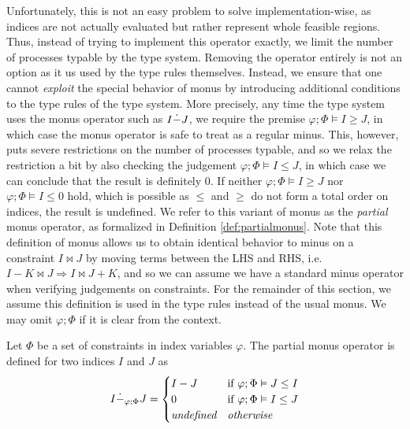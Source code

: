 Unfortunately, this is not an easy problem to solve implementation-wise, as indices are not actually evaluated but rather represent whole feasible regions. Thus, instead of trying to implement this operator exactly, we limit the number of processes typable by the type system. Removing the operator entirely is not an option as it us used by the type rules themselves. Instead, we ensure that one cannot \textit{exploit} the special behavior of monus by introducing additional conditions to the type rules of the type system. More precisely, any time the type system uses the monus operator such as $I \dot - J$, we require the premise $\varphi;\Phi \vDash I \geq J$, in which case the monus operator is safe to treat as a regular minus. This, however, puts severe restrictions on the number of processes typable, and so we relax the restriction a bit by also checking the judgement $\varphi;\Phi \vDash I \leq J$, in which case we can conclude that the result is definitely $0$. If neither $\varphi;\Phi\vDash I \geq J$ nor $\varphi;\Phi\vDash I \leq 0$ hold, which is possible as $\leq$ and $\geq$ do not form a total order on indices, the result is undefined. We refer to this variant of monus as the \textit{partial} monus operator, as formalized in Definition \ref{def:partialmonus}. Note that this definition of monus allows us to obtain identical behavior to minus on a constraint $I \bowtie J$ by moving terms between the LHS and RHS, i.e. $I - K \bowtie J \Rightarrow I \bowtie J + K$, and so we can assume we have a standard minus operator when verifying judgements on constraints. For the remainder of this section, we assume this definition is used in the type rules instead of the usual monus. We may omit $\varphi;\Phi$ if it is clear from the context.%
%
%
\begin{defi}\label{def:partialmonus}
Let $\Phi$ be a set of constraints in index variables $\varphi$. The partial monus operator is defined for two indices $I$ and $J$ as
\begin{equation*}
    I \dot -_{\varphi;\Phi} J = \begin{cases}
    I - J &\text{if $\varphi;\Phi \vDash J \leq I$}\\
    0 &\text{if $\varphi;\Phi \vDash I \leq J$}\\
    \textit{undefined} & \textit{otherwise}
    \end{cases}
\end{equation*}
\end{defi}


